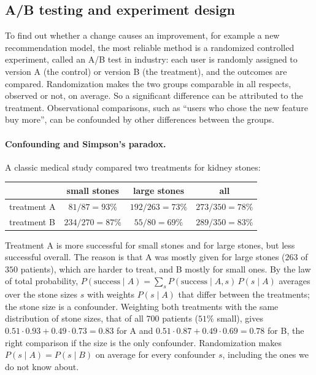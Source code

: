 \documentclass[11pt]{article}
\theoremstyle{definition}
\theoremstyle{plain}
\theoremstyle{remark}
\begin{document}
\subsection{A/B testing and experiment design}

To find out whether a change causes an improvement, for example a new recommendation model, the most reliable method is a randomized controlled experiment, called an A/B test in industry: each user is randomly assigned to version A (the control) or version B (the treatment), and the outcomes are compared. Randomization makes the two groups comparable in all respects, observed or not, on average. So a significant difference can be attributed to the treatment. Observational comparisons, such as ``users who chose the new feature buy more'', can be confounded by other differences between the groups.

\paragraph{Confounding and Simpson's paradox.} A classic medical study compared two treatments for kidney stones:
\begin{center}
    \renewcommand{\arraystretch}{1.2}
    \begin{tabular}{l|ccc}
        & small stones & large stones & all \\
        \hline
        treatment A & $81/87 = 93\%$ & $192/263 = 73\%$ & $273/350 = 78\%$ \\
        treatment B & $234/270 = 87\%$ & $55/80 = 69\%$ & $289/350 = 83\%$
    \end{tabular}
\end{center}
Treatment A is more successful for small stones and for large stones, but less successful overall. The reason is that A was mostly given for large stones ($263$ of $350$ patients), which are harder to treat, and B mostly for small ones. By the law of total probability, $P(\text{success} \mid A) = \sum_s P(\text{success} \mid A, s)\,P(s \mid A)$ averages over the stone sizes $s$ with weights $P(s \mid A)$ that differ between the treatments; the stone size is a confounder. Weighting both treatments with the same distribution of stone sizes, that of all $700$ patients ($51\%$ small), gives $0.51 \cdot 0.93 + 0.49 \cdot 0.73 = 0.83$ for A and $0.51 \cdot 0.87 + 0.49 \cdot 0.69 = 0.78$ for B, the right comparison if the size is the only confounder. Randomization makes $P(s \mid A) = P(s \mid B)$ on average for every confounder $s$, including the ones we do not know about.
\end{document}
